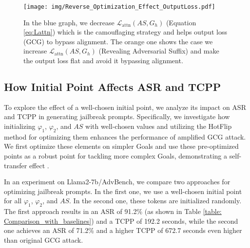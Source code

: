 \begin{figure}[h]
    \centering
    \texttt{[image: img/Reverse\_Optimization\_Effect\_OutputLoss.pdf]}
    \caption{In the blue graph, we decrease $\mathcal{L}_{\text{attn}}(AS, G_h)$ (Equation \ref{eq:Lattn}) which is the camouflaging strategy and helps output loss (GCG) to bypass alignment. The orange one shows the case we increase $\mathcal{L}_{\text{attn}}(AS, G_h)$ (Revealing Adversarial Suffix) and make the output loss flat and avoid it bypassing alignment.}
    \label{fig: Reverse_Optimization_Effect_OutputLoss}
\end{figure}



\subsection{How Initial Point Affects ASR and TCPP}
\label{sec:good_initial_point}

To explore the effect of a well-chosen initial point, we analyze its impact on ASR and TCPP in generating jailbreak prompts. Specifically, we investigate how initializing  $\varphi_1$, $\varphi_2$, and $AS$  with well-chosen values and utilizing the HotFlip method \cite{ebrahimi2017hotflip, wallace2019universal} for optimizing them enhances the performance of amplified GCG attack. We first optimize these elements on simpler Goals and use these pre-optimized points as a robust point for tackling more complex Goals, demonstrating a self-transfer effect \cite{andriushchenko2024jailbreaking}.

In an experiment on Llama2-7b/AdvBench, we compare two approaches for optimizing jailbreak prompts. In the first one, we use a well-chosen initial point for all $\varphi_1$, $\varphi_2$, and $AS$. In the second one, these tokens are initialized randomly. The first approach results in an ASR of 91.2\% (as shown in Table \ref{table: Comparison_with_baselines}) and a TCPP of 192.2 seconds, while the second one achieves an ASR of 71.2\%  and a higher TCPP of 672.7 seconds even higher than original GCG attack. %












